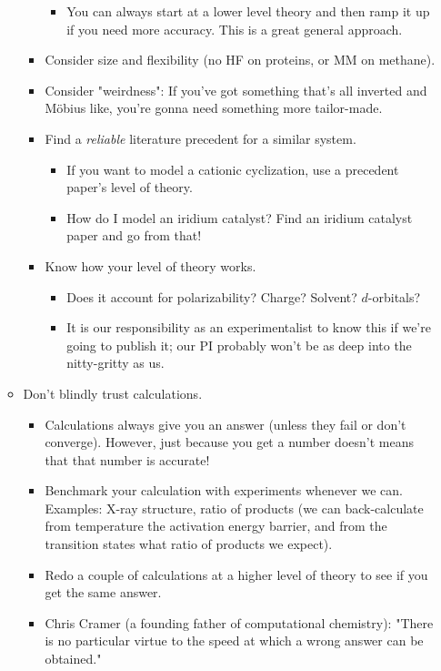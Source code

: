 \documentclass[../notes.tex]{subfiles}
\begin{document}
\begin{itemize}
\begin{itemize}
\begin{itemize}
\begin{itemize}
                \item You can always start at a lower level theory and then ramp it up if you need more accuracy. This is a great general approach.
            \end{itemize}
            \item Consider size and flexibility (no HF on proteins, or MM on methane).
            \item Consider "weirdness": If you've got something that's all inverted and M\"{o}bius like, you're gonna need something more tailor-made.
            \item Find a \emph{reliable} literature precedent for a similar system.
            \begin{itemize}
                \item If you want to model a cationic cyclization, use a precedent paper's level of theory.
                \item How do I model an iridium catalyst? Find an iridium catalyst paper and go from that!
            \end{itemize}
            \item Know how your level of theory works.
            \begin{itemize}
                \item Does it account for polarizability? Charge? Solvent? $d$-orbitals?
                \item It is our responsibility as an experimentalist to know this if we're going to publish it; our PI probably won't be as deep into the nitty-gritty as us.
            \end{itemize}
        \end{itemize}
        \item Don't blindly trust calculations.
        \begin{itemize}
            \item Calculations always give you an answer (unless they fail or don't converge). However, just because you get a number doesn't means that that number is accurate!
            \item Benchmark your calculation with experiments whenever we can. Examples: X-ray structure, ratio of products (we can back-calculate from temperature the activation energy barrier, and from the transition states what ratio of products we expect).
            \item Redo a couple of calculations at a higher level of theory to see if you get the same answer.
            \item Chris Cramer (a founding father of computational chemistry): "There is no particular virtue to the speed at which a wrong answer can be obtained."

\end{itemize}
\end{itemize}
\end{itemize}
\end{document}
